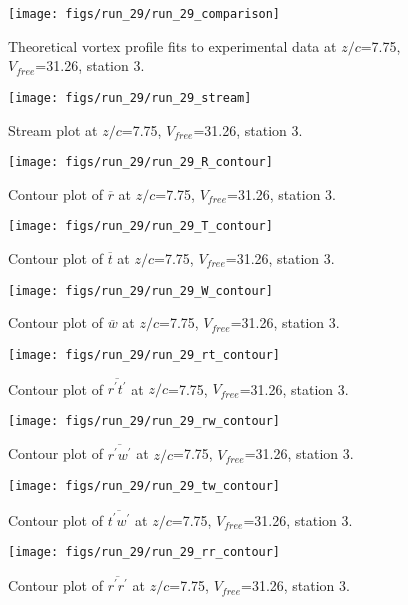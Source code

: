 \begin{figure}[H]
\centering
\texttt{[image: figs/run\_29/run\_29\_comparison]}
\caption{Theoretical vortex profile fits to experimental data at $z/c$=7.75, $V_{free}$=31.26, station 3.}
\end{figure}


\begin{figure}[H]
\centering
\texttt{[image: figs/run\_29/run\_29\_stream]}
\caption{Stream plot at $z/c$=7.75, $V_{free}$=31.26, station 3.}
\end{figure}


\begin{figure}[H]
\centering
\texttt{[image: figs/run\_29/run\_29\_R\_contour]}
\caption{Contour plot of $\overline{r}$ at $z/c$=7.75, $V_{free}$=31.26, station 3.}
\end{figure}


\begin{figure}[H]
\centering
\texttt{[image: figs/run\_29/run\_29\_T\_contour]}
\caption{Contour plot of $\overline{t}$ at $z/c$=7.75, $V_{free}$=31.26, station 3.}
\end{figure}


\begin{figure}[H]
\centering
\texttt{[image: figs/run\_29/run\_29\_W\_contour]}
\caption{Contour plot of $\overline{w}$ at $z/c$=7.75, $V_{free}$=31.26, station 3.}
\end{figure}


\begin{figure}[H]
\centering
\texttt{[image: figs/run\_29/run\_29\_rt\_contour]}
\caption{Contour plot of $\overline{r^\prime t^\prime}$ at $z/c$=7.75, $V_{free}$=31.26, station 3.}
\end{figure}


\begin{figure}[H]
\centering
\texttt{[image: figs/run\_29/run\_29\_rw\_contour]}
\caption{Contour plot of $\overline{r^\prime w^\prime}$ at $z/c$=7.75, $V_{free}$=31.26, station 3.}
\end{figure}


\begin{figure}[H]
\centering
\texttt{[image: figs/run\_29/run\_29\_tw\_contour]}
\caption{Contour plot of $\overline{t^\prime w^\prime}$ at $z/c$=7.75, $V_{free}$=31.26, station 3.}
\end{figure}


\begin{figure}[H]
\centering
\texttt{[image: figs/run\_29/run\_29\_rr\_contour]}
\caption{Contour plot of $\overline{r^\prime r^\prime}$ at $z/c$=7.75, $V_{free}$=31.26, station 3.}
\end{figure}


